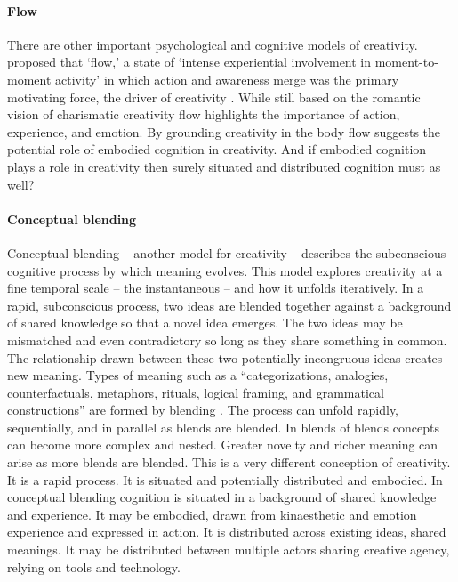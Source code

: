 \documentclass{article}
\begin{document}
\paragraph{Flow}
There are other important psychological and cognitive models of creativity. 
%
\citeauthor{Csikszentmihalyi2014a} proposed that `flow,' a state of `intense experiential involvement in moment-to-moment activity' in which action and awareness merge \citeyearpar{Csikszentmihalyi2014a} was the primary motivating force, the driver of creativity \citep{Csikszentmihalyi2014}. 
While still based on the romantic vision of charismatic creativity
flow highlights the importance of action, experience, and emotion. 
By grounding creativity in the body 
flow suggests the potential role of embodied cognition 
in creativity. 
And if embodied cognition plays a role in creativity then surely situated and distributed cognition must as well?
%

\paragraph{Conceptual blending}
Conceptual blending -- another model for creativity --
describes the subconscious cognitive process by which meaning evolves.
This model explores creativity at a fine temporal scale -- the instantaneous -- and how it unfolds iteratively.
In a rapid, subconscious process, 
two ideas are blended together against a background of shared knowledge so that a novel idea emerges. 
The two ideas may be mismatched and even contradictory so long as they share something in common.  
The relationship drawn between these two potentially incongruous ideas creates new meaning.
Types of meaning such as a  ``categorizations, analogies, counterfactuals, metaphors, rituals, logical framing, and grammatical
constructions'' are formed by blending \citep{Fauconnier2000}. 
The process can unfold rapidly, sequentially, and in parallel as blends are blended. 
In blends of blends concepts can become more complex and nested.
Greater novelty and richer meaning can arise as more blends are blended. 
This is a very different conception of creativity.
It is a rapid process. It is situated and potentially distributed and embodied. 
In conceptual blending cognition is situated in a background of shared knowledge and experience. 
It may be embodied, drawn from kinaesthetic and emotion experience and expressed in action.
It is distributed across existing ideas, shared meanings. 
It may be distributed between multiple actors sharing creative agency, relying on tools and technology. 
\end{document}
